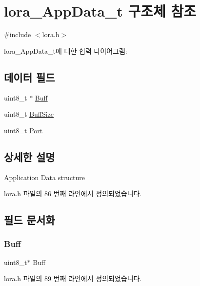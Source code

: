 \hypertarget{structlora___app_data__t}{}\section{lora\+\_\+\+App\+Data\+\_\+t 구조체 참조}
\label{structlora___app_data__t}


{\ttfamily \#include $<$lora.\+h$>$}



lora\+\_\+\+App\+Data\+\_\+t에 대한 협력 다이어그램\+:
\subsection*{데이터 필드}
\begin{DoxyCompactItemize}
\item 
uint8\+\_\+t $\ast$ \mbox{\hyperlink{structlora___app_data__t_aead7dd380dc6a9f1711bd8f7b821a7fc}{Buff}}
\item 
uint8\+\_\+t \mbox{\hyperlink{structlora___app_data__t_a52d0e53a3b318f8c75791c051159efb0}{Buff\+Size}}
\item 
uint8\+\_\+t \mbox{\hyperlink{structlora___app_data__t_a4b93121f04819fbab96346736fa720a9}{Port}}
\end{DoxyCompactItemize}


\subsection{상세한 설명}
Application Data structure 

lora.\+h 파일의 86 번째 라인에서 정의되었습니다.



\subsection{필드 문서화}
\mbox{\label{structlora___app_data__t_aead7dd380dc6a9f1711bd8f7b821a7fc}} 
\subsubsection{\texorpdfstring{Buff}{Buff}}
{\footnotesize\ttfamily uint8\+\_\+t$\ast$ Buff}



lora.\+h 파일의 89 번째 라인에서 정의되었습니다.

